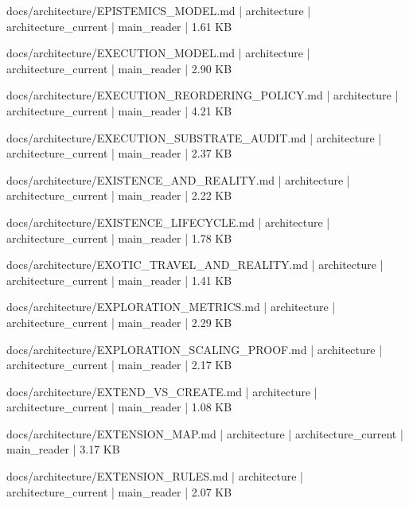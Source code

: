 \documentclass[11pt,a4paper]{report}
\begin{document}
{\small\ttfamily\raggedright docs/\allowbreak{}architecture/\allowbreak{}EPISTEMICS\_MODEL.\allowbreak{}md | architecture | architecture\_current | main\_reader | 1.\allowbreak{}61 KB\par}
{\small\ttfamily\raggedright docs/\allowbreak{}architecture/\allowbreak{}EXECUTION\_MODEL.\allowbreak{}md | architecture | architecture\_current | main\_reader | 2.\allowbreak{}90 KB\par}
{\small\ttfamily\raggedright docs/\allowbreak{}architecture/\allowbreak{}EXECUTION\_REORDERING\_POLICY.\allowbreak{}md | architecture | architecture\_current | main\_reader | 4.\allowbreak{}21 KB\par}
{\small\ttfamily\raggedright docs/\allowbreak{}architecture/\allowbreak{}EXECUTION\_SUBSTRATE\_AUDIT.\allowbreak{}md | architecture | architecture\_current | main\_reader | 2.\allowbreak{}37 KB\par}
{\small\ttfamily\raggedright docs/\allowbreak{}architecture/\allowbreak{}EXISTENCE\_AND\_REALITY.\allowbreak{}md | architecture | architecture\_current | main\_reader | 2.\allowbreak{}22 KB\par}
{\small\ttfamily\raggedright docs/\allowbreak{}architecture/\allowbreak{}EXISTENCE\_LIFECYCLE.\allowbreak{}md | architecture | architecture\_current | main\_reader | 1.\allowbreak{}78 KB\par}
{\small\ttfamily\raggedright docs/\allowbreak{}architecture/\allowbreak{}EXOTIC\_TRAVEL\_AND\_REALITY.\allowbreak{}md | architecture | architecture\_current | main\_reader | 1.\allowbreak{}41 KB\par}
{\small\ttfamily\raggedright docs/\allowbreak{}architecture/\allowbreak{}EXPLORATION\_METRICS.\allowbreak{}md | architecture | architecture\_current | main\_reader | 2.\allowbreak{}29 KB\par}
{\small\ttfamily\raggedright docs/\allowbreak{}architecture/\allowbreak{}EXPLORATION\_SCALING\_PROOF.\allowbreak{}md | architecture | architecture\_current | main\_reader | 2.\allowbreak{}17 KB\par}
{\small\ttfamily\raggedright docs/\allowbreak{}architecture/\allowbreak{}EXTEND\_VS\_CREATE.\allowbreak{}md | architecture | architecture\_current | main\_reader | 1.\allowbreak{}08 KB\par}
{\small\ttfamily\raggedright docs/\allowbreak{}architecture/\allowbreak{}EXTENSION\_MAP.\allowbreak{}md | architecture | architecture\_current | main\_reader | 3.\allowbreak{}17 KB\par}
{\small\ttfamily\raggedright docs/\allowbreak{}architecture/\allowbreak{}EXTENSION\_RULES.\allowbreak{}md | architecture | architecture\_current | main\_reader | 2.\allowbreak{}07 KB\par}
\end{document}
